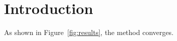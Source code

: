 \documentclass{article}
\begin{document}
\section{Introduction}\label{sec:intro}
As shown in Figure~\ref{fig:results}, the method converges.
\end{document}
